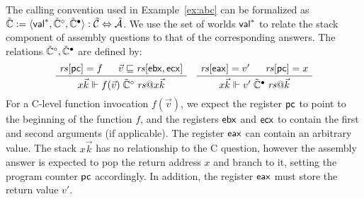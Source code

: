 \begin{example} %
The calling convention used in Example~\ref{ex:abc}
can be formalized as %
$\tilde{\mathbb{C}} :=
  \langle  \mathsf{val} ^*, \tilde{\mathbb{C}}^\circ, \tilde{\mathbb{C}}^\bullet \rangle :
    \tilde{\mathcal{C}} \Leftrightarrow \tilde{\mathcal{A}}$.
We use the set of worlds $ \mathsf{val} ^*$
to relate the stack component of
assembly questions to that of the corresponding answers.
The relations $\tilde{\mathbb{C}}^\circ, \tilde{\mathbb{C}}^\bullet$
are defined by:
\[
  \figsize
  \AxiomC{$\mathit{rs}[\kw{pc}] = f$}
  \AxiomC{\hspace{-1em} $\vec{v} \sqsubseteq \mathit{rs}[\kw{ebx}, \kw{ecx}]$}
  \BinaryInfC{$
    x \vec{k} \Vdash
    f(\vec{v}) \mathrel{\tilde{\mathbb{C}}^\que} \mathit{rs}@ x \vec{k}
  $}
  \DisplayProof
  \quad
  \AxiomC{$\mathit{rs}[\kw{eax}] = v'$}
  \AxiomC{\hspace{-1em} $\mathit{rs}[\kw{pc}] = x$}
  \BinaryInfC{$
    x \vec{k} \Vdash
    v' \mathrel{\tilde{\mathbb{C}}^\ans} \mathit{rs}@\vec{k}
  $}
  \DisplayProof
\]
For a C-level function invocation $f(\vec{v})$,
we expect the register $ \mathsf{pc} $ to point to
the beginning of the function $f$,
and the registers $ \mathsf{ebx} $ and $ \mathsf{ecx} $
to contain the first and second arguments (if applicable).
The register $ \mathsf{eax} $ can contain an arbitrary value.
The stack $x \vec{k}$ has no relationship to the C question,
however the assembly answer is expected to pop the return address $x$
and branch to it, setting the program counter $ \mathsf{pc} $ accordingly.
In addition,
the register $ \mathsf{eax} $
must store
the return value $v'$.
\end{example}


